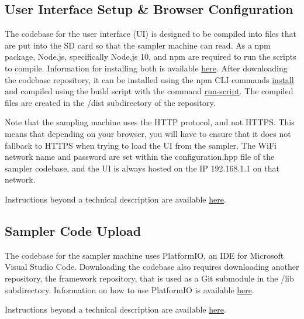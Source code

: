 \documentclass[11pt, letterpaper]{article}
\begin{document}
\subsection{User Interface Setup \& Browser Configuration}
The codebase for the user interface (UI) is designed to be compiled into files that are put into the SD card so that the sampler machine can read. As a npm package, Node.js, specifically Node.js 10, and npm are required to run the scripts to compile. Information for installing both is available \href{https://docs.npmjs.com/downloading-and-installing-node-js-and-npm}{here}. After downloading the codebase repository, it can be installed using the npm CLI commands \href{https://docs.npmjs.com/cli/v10/commands/npm-install}{install} and compiled using the build script with the command \href{https://docs.npmjs.com/cli/v10/commands/npm-run-script}{run-script}. The compiled files are created in the /dist subdirectory of the repository.
\newline\par\noindent
Note that the sampling machine uses the HTTP protocol, and not HTTPS. This means that depending on your browser, you will have to ensure that it does not fallback to HTTPS when trying to load the UI from the sampler. The WiFi network name and password are set within the configuration.hpp file of the sampler codebase, and the UI is always hosted on the IP 192.168.1.1 on that network.
\newline\par\noindent
Instructions beyond a technical description are available \href{}{here}.

\subsection{Sampler Code Upload}
The codebase for the sampler machine uses PlatformIO, an IDE for Microsoft Visual Studio Code. Downloading the codebase also requires downloading another repository, the framework repository, that is used as a Git submodule in the /lib subdirectory. Information on how to use PlatformIO is available \href{https://docs.platformio.org/en/latest/integration/ide/vscode.html}{here}.
\newline\par\noindent
Instructions beyond a technical description are available \href{}{here}.
\end{document}

